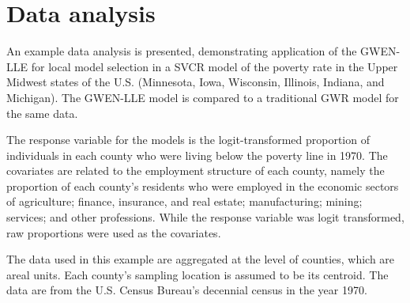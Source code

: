 \documentclass[authoryear, review, 11pt]{elsarticle}
\begin{document}
	
	
	
				
	

			
\section{Data analysis\label{section:data-analysis}}
    An example data analysis is presented, demonstrating application of the GWEN-LLE for local model selection in a SVCR model of the poverty rate in the Upper Midwest states of the U.S. (Minnesota, Iowa, Wisconsin, Illinois, Indiana, and Michigan). The GWEN-LLE model is compared to a traditional GWR model for the same data.

    The response variable for the models is the logit-transformed proportion of individuals in each county who were living below the poverty line in 1970. The covariates are related to the employment structure of each county, namely the proportion of each county's residents who were employed in the economic sectors of agriculture; finance, insurance, and real estate; manufacturing; mining; services; and other professions. While the response variable was logit transformed, raw proportions were used as the covariates.

The data used in this example are aggregated at the level of counties, which are areal units. Each county's sampling location is assumed to be its centroid. The data are from the U.S. Census Bureau's decennial census in the year 1970. 
	
\end{document}
